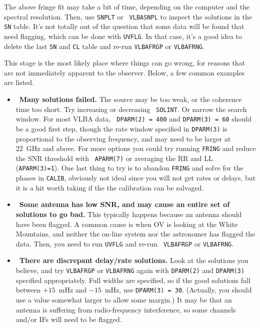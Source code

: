 \begin{enumerate}
{The above fringe fit may take a bit of time, depending on the
computer and the spectral resolution.  Then, use {\tt SNPLT} or {\tt
VLBASNPL} to inspect the solutions in the {\tt SN} table.  It's not
totally out of the question that some data will be found that need
flagging, which can be done with {\tt UVFLG}\@.  In that case, it's a
good idea to delete the last {\tt SN} and {\tt CL} table and re-run
{\tt VLBAFRGP} or {\tt VLBAFRNG}\@.

This  stage is the most likely place
where things can go wrong, for reasons that are not immediately
apparent to the observer.  Below, a few common examples are listed.
}

\begin{itemize}

\item\ {{\bf Many solutions failed.}  The source may be too weak, or
the coherence time too short.  Try increasing or decreasing {\tt
SOLINT}\@.  Or narrow the search window.  For most VLBA data, {\tt
DPARM(2) = 400} and {\tt DPARM(3) = 60} should be a good first step,
though the rate window specified in {\tt DPARM(3)} is proportional to
the observing frequency, and may need to be larger at 22~GHz and
above. For more options you could try
running {\tt FRING} and reduce the SNR threshold with {\tt
APARM(7)} or averaging the RR and LL ({\tt APARM(3)=1})\@.
One last thing to try is to abandon {\tt FRING} and
solve for the phases in {\tt CALIB}, obviously not ideal since you
will not get rates or delays, but it is a hit worth taking if the
the calibration can be salvaged.}

\item\ {{\bf Some antenna has low SNR, and may cause an entire set of
solutions to go bad.} This typically happens because an antenna should
have been flagged.  A common cause is when OV is looking at the White
Mountains, and neither the on-line system nor the astronomer has
flagged the data.  Then, you need to run {\tt UVFLG} and re-run {\tt
VLBAFRGP} or {\tt VLBAFRNG}\@.}

\item\ {{\bf There are discrepant delay/rate solutions.} Look at the
solutions you believe, and try  {\tt VLBAFRGP} or {\tt VLBAFRNG} again
with {\tt DPARM(2)} and {\tt DPARM(3)} specified appropriately.  Full
widths are specified, so if the good solutions fall between $+15$~mHz
and $-15$~mHz, use {\tt DPARM(3) = 30}\@.  (Actually, you should use a
value somewhat larger to allow some margin.)  It may be that an
antenna is suffering from radio-frequency interference, so some
channels and/or IFs will need to be flagged.}


\end{itemize}
\end{enumerate}
